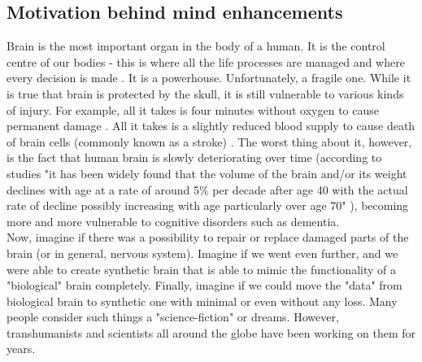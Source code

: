 \documentclass[12pt]{article}
\begin{document}
\subsection{Motivation behind mind enhancements}
	Brain is the most important organ in the body of a human. It is the control centre of our bodies - this is where all the life processes are managed and where every decision is made \cite{brain:1}. It is a powerhouse. Unfortunately, a fragile one. While it is true that brain is protected by the skull, it is still vulnerable to various kinds of injury. For example, all it takes is four minutes without oxygen to cause permanent damage \cite{lackofoxygen}. All it takes is a slightly reduced blood supply to cause death of brain cells (commonly known as a stroke) \cite{stroke:1}. The worst thing about it, however, is the fact that human brain is slowly deteriorating over time (according to studies "it has been widely found that the volume of the brain and/or its weight declines with age at a rate of around 5\% per decade after age 40 with the actual rate of decline possibly increasing with age particularly over age 70" \cite{brainAging}), becoming more and more vulnerable to cognitive disorders such as dementia.
	\\Now, imagine if there was a possibility to repair or replace damaged parts of the brain (or in general, nervous system). Imagine if we went even further, and we were able to create synthetic brain that is able to mimic the functionality of a "biological" brain completely. Finally, imagine if we could move the "data" from biological brain to synthetic one with minimal or even without any loss. Many people consider such things a "science-fiction" or dreams. However, transhumanists and scientists all around the globe have been working on them for years.
\end{document}
